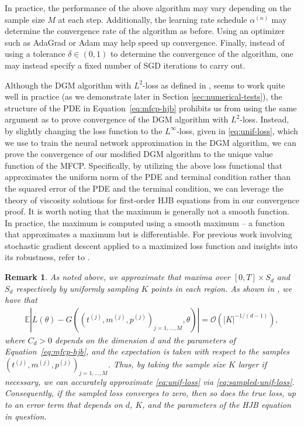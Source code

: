 \documentclass[11pt,reqno]{amsart}
\numberwithin{equation}{section}
\theoremstyle{plain}
\newtheorem{remark}[theorem]{Remark}
\newcommand{\E}{\mathbb{E}}
\begin{document}
In practice, the performance of the above algorithm may vary depending on the sample size $M$ at each step. Additionally, the learning rate schedule $\alpha^{(n)}$ may determine the convergence rate of the algorithm as before. Using an optimizer such as AdaGrad or Adam may help speed up convergence. Finally, instead of using a tolerance $\delta \in (0,1)$ to determine the convergence of the algorithm, one may instead specify a fixed number of SGD iterations to carry out.

Although the DGM algorithm with $L^2$-loss as defined in \cite{dgm}, seems to work quite well in practice (as we demonstrate later in Section \ref{sec:numerical-tests}), the structure of the PDE in Equation~\eqref{eq:mfcp-hjb} prohibits us from using the same argument as \cite{dgm} to prove convergence of the DGM algorithm with $L^2$-loss. Instead, by slightly changing the loss function to the $L^\infty$-loss, given in \eqref{eq:unif-loss}, which we use to train the neural network approximation in the DGM algorithm, we can prove the convergence of our modified DGM algorithm to the unique value function of the MFCP. Specifically, by utilizing the above loss functional that approximates the uniform norm of the PDE and terminal condition rather than the squared error of the PDE and the terminal condition, we can leverage the theory of viscosity solutions for first-order HJB equations from \cite{visc-users} in our convergence proof. It is worth noting that the maximum is generally not a smooth function. In practice, the maximum is computed using a smooth maximum -- a function that approximates a maximum but is differentiable. For previous work involving stochastic gradient descent applied to a maximized loss function and insights into its robustness, refer to \cite{pmlr-v48-shalev-shwartzb16}. 
\begin{remark}
\normalfont
As noted above, we approximate that maxima over $[0, T] \times S_d$ and $S_d$ respectively by uniformly sampling $K$ points in each region. As shown in \cite[Lemma 1]{cohen2024deep}, we have that
\begin{align*}
    \E|L(\theta) - G((t^{(j)}, m^{(j)}, p^{(j)})_{j = 1, \ldots, M}, \theta)| = \mathcal{O}(|K|^{-1/(d-1)}),
\end{align*}
where $C_d > 0$ depends on the dimension $d$ and the parameters of Equation~\eqref{eq:mfcp-hjb}, and the expectation is taken with respect to the samples $(t^{(j)}, m^{(j)}, p^{(j)})_{j = 1, \ldots, M}$. Thus, by taking the sample size $K$ larger if necessary, we can accurately approximate \eqref{eq:unif-loss} via \eqref{eq:sampled-unif-loss}. Consequently, if the sampled loss converges to zero, then so does the true loss, up to an error term that depends on $d$, $K$, and the parameters of the HJB equation in question.
\end{remark}
\end{document}
